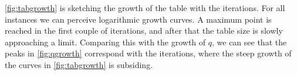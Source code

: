 \autoref{fig:tabgrowth} is sketching the growth of the table with the iterations. For all instances we can perceive logarithmic growth curves. A maximum point is reached in the first couple of iterations, and after that the table size is slowly approaching a limit. Comparing this with the growth of $q$, we can see that the peaks in 
\autoref{fig:qgrowth} correspond with the iterations, where the steep growth of the curves in \autoref{fig:tabgrowth} is subsiding.








%




